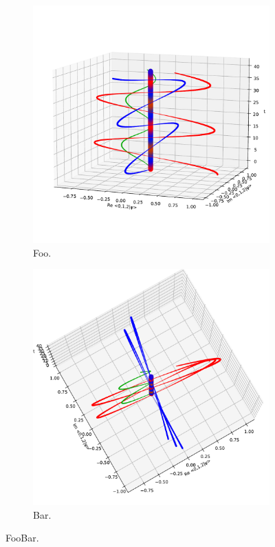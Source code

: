 \begin{figure}
  \centering
  \begin{subfigure}[b]{\textwidth}
    \includegraphics[height=0.4\textheight,clip,trim=60 80 0 120]{img/3ldetect/hermitianSpaceTime_side.pdf}
    \caption{Foo.}
  \end{subfigure}
  \par\bigskip
  \begin{subfigure}[b]{\textwidth}
    \includegraphics[height=0.5\textheight,clip,trim= 0 20 0 80]{img/3ldetect/hermitianSpaceTime_top.pdf}
    \caption{Bar.}
  \end{subfigure}
  \par\bigskip
  \caption{FooBar.}
\end{figure}

